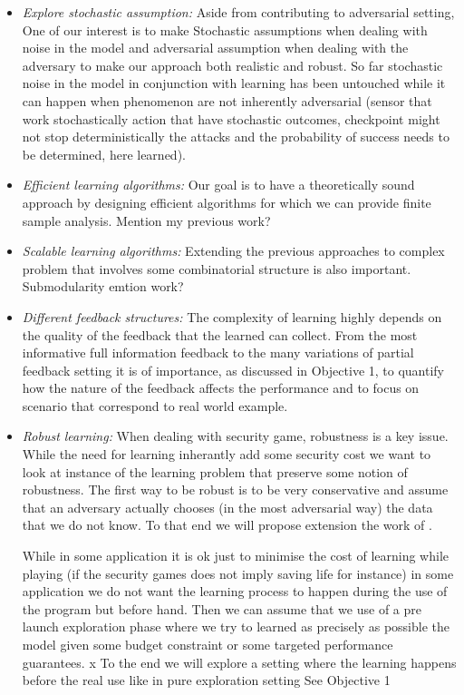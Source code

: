 \begin{itemize}
\item \textit{Explore stochastic assumption:} Aside from contributing to adversarial setting, One of our interest  is to make Stochastic assumptions when dealing with noise in the model and adversarial assumption when dealing with the adversary to make our approach both realistic and robust.
So far stochastic noise in the model  in conjunction with learning has been untouched while it can happen when phenomenon are not inherently adversarial (sensor that work stochastically action that have stochastic outcomes, checkpoint might not stop deterministically the attacks and the probability of success needs to be determined, here learned).
\item \textit{Efficient learning algorithms:} 
Our goal is to have a theoretically sound approach by designing efficient algorithms for which we can provide finite sample analysis. Mention my previous work?

\item \textit{Scalable learning algorithms:} Extending the previous approaches to complex problem that involves some combinatorial structure is also important. Submodularity emtion work?

\item \textit{Different feedback structures:} The complexity of learning highly depends on the quality of the feedback that the learned can collect. From the most informative full information feedback to the many variations of partial feedback setting it is of importance, as discussed in Objective 1, to quantify how the nature of the feedback  affects the performance and to focus on scenario that correspond to real world example.

\item \textit{Robust learning:} When dealing with security game, robustness is a key issue. While the need for learning inherantly add some security cost we want to look at instance of the learning problem that preserve some notion of robustness. The first way to be robust is to be very conservative and assume that an adversary actually chooses (in the most adversarial way) the data that we do not know. To that end we will propose extension the work of \cite{Balcan15CR}.

While in some application it is ok just to minimise the cost of learning while playing (if the security games does not imply saving life for instance) in some application we do not want the learning process to happen during the use of the program but before hand. Then we can assume that we use of a pre launch exploration phase where we try to learned as precisely as possible the model given some budget constraint or some targeted performance guarantees. x To the end we will explore a setting where the learning happens before the real use like in pure exploration setting See Objective 1


\end{itemize}
